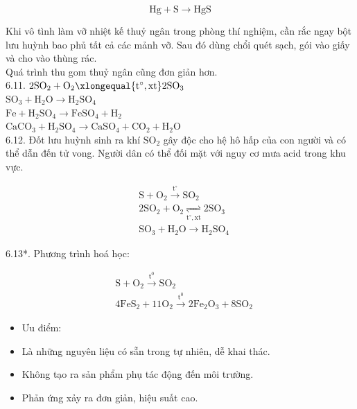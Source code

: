 \documentclass[10pt]{article}
\begin{document}
$$
\mathrm{Hg}+\mathrm{S} \rightarrow \mathrm{HgS}
$$

Khi vô tình làm vỡ nhiệt kế thuỷ ngân trong phòng thí nghiệm, cần rắc ngay bột lưu huỳnh bao phủ tất cả các mảnh vỡ. Sau đó dùng chổi quét sạch, gói vào giấy và cho vào thùng rác.\\
Quá trình thu gom thuỷ ngân cũng đơn giản hơn.\\
6.11. $2 \mathrm{SO}_{2}+\mathrm{O}_{2} \xlongequal{\mathrm{t}^{\circ}, \mathrm{xt}} 2 \mathrm{SO}_{3}$\\
$\mathrm{SO}_{3}+\mathrm{H}_{2} \mathrm{O} \rightarrow \mathrm{H}_{2} \mathrm{SO}_{4}$\\
$\mathrm{Fe}+\mathrm{H}_{2} \mathrm{SO}_{4} \rightarrow \mathrm{FeSO}_{4}+\mathrm{H}_{2}$\\
$\mathrm{CaCO}_{3}+\mathrm{H}_{2} \mathrm{SO}_{4} \rightarrow \mathrm{CaSO}_{4}+\mathrm{CO}_{2}+\mathrm{H}_{2} \mathrm{O}$\\
6.12. Đốt lưu huỳnh sinh ra khí $\mathrm{SO}_{2}$ gây độc cho hệ hô hấp của con người và có thể dẫn đến tử vong. Người dân có thể đối mặt với nguy cơ mưa acid trong khu vực.

$$
\begin{aligned}
& \mathrm{S}+\mathrm{O}_{2} \xrightarrow{\mathrm{t}^{\circ}} \mathrm{SO}_{2} \\
& 2 \mathrm{SO}_{2}+\mathrm{O}_{2} \underset{\mathrm{t}^{\circ}, \mathrm{xt}}{\rightleftharpoons} 2 \mathrm{SO}_{3} \\
& \mathrm{SO}_{3}+\mathrm{H}_{2} \mathrm{O} \rightarrow \mathrm{H}_{2} \mathrm{SO}_{4}
\end{aligned}
$$

6.13*. Phương trình hoá học:

$$
\begin{aligned}
& \mathrm{S}+\mathrm{O}_{2} \xrightarrow{\mathrm{t}^{0}} \mathrm{SO}_{2} \\
& 4 \mathrm{FeS}_{2}+11 \mathrm{O}_{2} \xrightarrow{\mathrm{t}^{0}} 2 \mathrm{Fe}_{2} \mathrm{O}_{3}+8 \mathrm{SO}_{2}
\end{aligned}
$$

\begin{itemize}
  \item Ưu điểm:
\end{itemize}

\begin{itemize}
  \item Là những nguyên liệu có sẵn trong tự nhiên, dễ khai thác.
  \item Không tạo ra sản phẩm phụ tác động đến môi trường.
  \item Phản ứng xảy ra đơn giản, hiệu suất cao.
\end{itemize}
\end{document}
